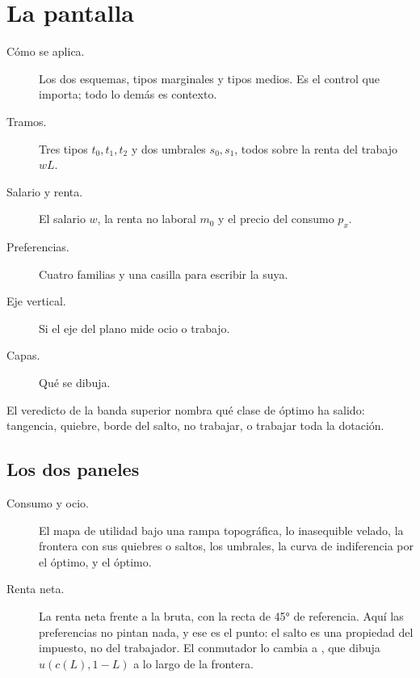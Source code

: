 \documentclass[11pt,a4paper]{appletmanual}
\begin{document}


\section{La pantalla}


\begin{description}
\item[Cómo se aplica.] Los dos esquemas, tipos marginales y tipos medios. Es el
  control que importa; todo lo demás es contexto.
\item[Tramos.] Tres tipos $t_0, t_1, t_2$ y dos umbrales $s_0, s_1$, todos
  sobre la renta del trabajo $wL$.
\item[Salario y renta.] El salario $w$, la renta no laboral $m_0$ y el precio
  del consumo $p_x$.
\item[Preferencias.] Cuatro familias y una casilla para escribir la suya.
\item[Eje vertical.] Si el eje del plano mide ocio o trabajo.
\item[Capas.] Qué se dibuja.
\end{description}

El veredicto de la banda superior nombra qué clase de óptimo ha salido:
tangencia, quiebre, borde del salto, no trabajar, o trabajar toda la dotación.

\subsection{Los dos paneles}

\begin{description}
\item[Consumo y ocio.] El mapa de utilidad bajo una rampa topográfica, lo
  inasequible velado, la frontera con sus quiebres o saltos, los umbrales, la
  curva de indiferencia por el óptimo, y el óptimo.
\item[Renta neta.] La renta neta frente a la bruta, con la recta de 45° de
  referencia. Aquí las preferencias no pintan nada, y ese es el punto: el salto
  es una propiedad del impuesto, no del trabajador. El conmutador lo cambia a
  , que dibuja $u(c(L), 1-L)$ a lo largo de la frontera.
\end{description}
\end{document}
